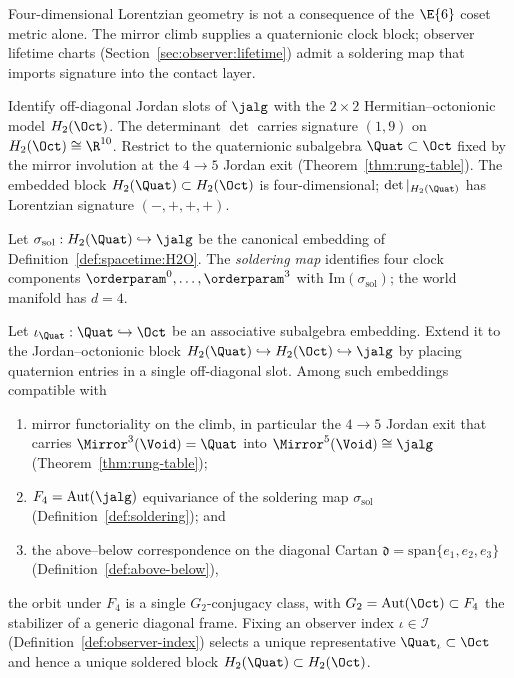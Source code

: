 Four-dimensional Lorentzian geometry is not a consequence of the $\E{6}$
coset metric alone. The mirror climb supplies a quaternionic clock block;
observer lifetime charts (Section~\ref{sec:observer:lifetime}) admit a
soldering map that imports signature into the contact layer.

\begin{definition}\label{def:spacetime:H2O}
Identify off-diagonal Jordan slots of $\jalg$ with the $2\times2$
Hermitian--octonionic model $H_2(\Oct)$. The determinant $\det$ carries
signature $(1,9)$ on $H_2(\Oct)\cong\R^{10}$. Restrict to the quaternionic
subalgebra $\Quat\subset\Oct$ fixed by the mirror involution at the
$4\to5$ Jordan exit (Theorem~\ref{thm:rung-table}). The embedded block
$H_2(\Quat)\subset H_2(\Oct)$ is four-dimensional; $\det|_{H_2(\Quat)}$
has Lorentzian signature $(-,+,+,+)$.
\end{definition}

\begin{definition}[Soldering]\label{def:soldering}
Let $\sigma_{\mathrm{sol}}:H_2(\Quat)\hookrightarrow\jalg$ be the canonical
embedding of Definition~\ref{def:spacetime:H2O}. The \emph{soldering map}
identifies four clock components $\orderparam^0,\ldots,\orderparam^3$ with
$\mathrm{Im}(\sigma_{\mathrm{sol}})$; the world manifold has $d=4$.
\end{definition}

\begin{lemma}
\label{lem:quat-F4}
Let $\iota_{\Quat}:\Quat\hookrightarrow\Oct$ be an associative subalgebra
embedding. Extend it to the Jordan--octonionic block
$H_2(\Quat)\hookrightarrow H_2(\Oct)\hookrightarrow\jalg$ by placing
quaternion entries in a single off-diagonal slot. Among such embeddings
compatible with
\begin{enumerate}[label=(\roman*),leftmargin=*]
  \item mirror functoriality on the climb, in particular the
    $4\to5$ Jordan exit that carries $\Mirror^3(\Void)=\Quat$ into
    $\Mirror^5(\Void)\cong\jalg$ (Theorem~\ref{thm:rung-table});
  \item $F_4=\mathrm{Aut}(\jalg)$ equivariance of the soldering map
    $\sigma_{\mathrm{sol}}$ (Definition~\ref{def:soldering}); and
  \item the above--below correspondence on the diagonal Cartan
    $\mathfrak{d}=\mathrm{span}\{e_1,e_2,e_3\}$
    (Definition~\ref{def:above-below}),
\end{enumerate}
the orbit under $F_4$ is a single $G_2$-conjugacy class, with
$G_2=\mathrm{Aut}(\Oct)\subset F_4$ the stabilizer of a generic
diagonal frame. Fixing an observer index $\iota\in\mathcal{I}$
(Definition~\ref{def:observer-index}) selects a unique representative
$\Quat_\iota\subset\Oct$ and hence a unique soldered block
$H_2(\Quat)\subset H_2(\Oct)$.
\end{lemma}

